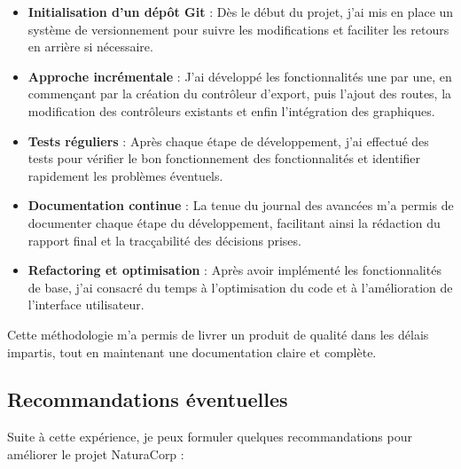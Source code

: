 \documentclass[a4paper,12pt]{report}
\begin{document}
  \begin{itemize}
    \item \textbf{Initialisation d'un dépôt Git} : Dès le début du projet, j'ai mis en place un système de versionnement pour suivre les modifications et faciliter les retours en arrière si nécessaire.
    
    \item \textbf{Approche incrémentale} : J'ai développé les fonctionnalités une par une, en commençant par la création du contrôleur d'export, puis l'ajout des routes, la modification des contrôleurs existants et enfin l'intégration des graphiques.
    
    \item \textbf{Tests réguliers} : Après chaque étape de développement, j'ai effectué des tests pour vérifier le bon fonctionnement des fonctionnalités et identifier rapidement les problèmes éventuels.
    
    \item \textbf{Documentation continue} : La tenue du journal des avancées m'a permis de documenter chaque étape du développement, facilitant ainsi la rédaction du rapport final et la tracçabilité des décisions prises.
    
    \item \textbf{Refactoring et optimisation} : Après avoir implémenté les fonctionnalités de base, j'ai consacré du temps à l'optimisation du code et à l'amélioration de l'interface utilisateur.
  \end{itemize}
  
  Cette méthodologie m'a permis de livrer un produit de qualité dans les délais impartis, tout en maintenant une documentation claire et complète.

  \subsection{Recommandations éventuelles}
  Suite à cette expérience, je peux formuler quelques recommandations pour améliorer le projet NaturaCorp :
  
\end{document}
